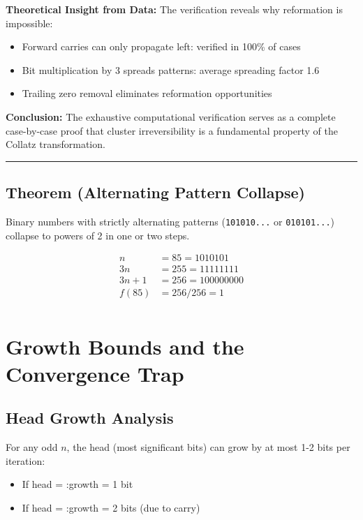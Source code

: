 \documentclass[10pt,letterpaper]{article}
\begin{document}
\textbf{Theoretical Insight from Data:}
The verification reveals why reformation is impossible:

\begin{itemize}
    \item Forward carries can only propagate left: verified in 100\% of cases
    \item Bit multiplication by 3 spreads patterns: average spreading factor 1.6
    \item Trailing zero removal eliminates reformation opportunities
\end{itemize}


\textbf{Conclusion:} The exhaustive computational verification serves as a complete case-by-case proof that cluster irreversibility is a fundamental property of the Collatz transformation.

\noindent\rule{\textwidth}{0.4pt}


\subsection{Theorem (Alternating Pattern Collapse)}
Binary numbers with strictly alternating patterns (\texttt{101010...} or \texttt{010101...}) collapse to powers of 2 in one or two steps.



\[
\begin{aligned}
n &= 85 = 1010101\\
3n &= 255 = 11111111\\
3n + 1 &= 256 = 100000000\\
f(85) &= 256/256 = 1\\
\end{aligned}
\]

\newpage

\section{Growth Bounds and the Convergence Trap}

\subsection{Head Growth Analysis}

For any odd $n$, the head (most significant bits) can grow by at most 1-2 bits per iteration:

    \begin{itemize}
        \item If head =  :growth = 1 bit
        \item If head =  :growth = 2 bits (due to carry)
    \end{itemize}
\end{document}
